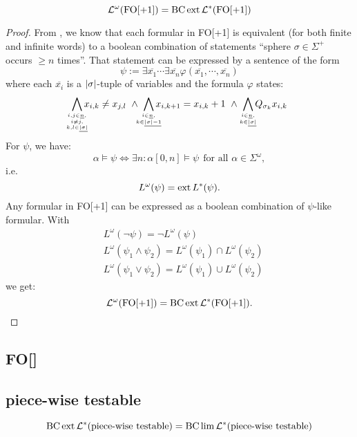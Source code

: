 \begin{thm}
\[ \mathcal{L}^\omega (\mathrm{FO[+1]}) = \operatorname{BC} \operatorname{ext} \mathcal{L}^*(\mathrm{FO[+1]}) \]
\end{thm}

\begin{proof}
From \cite[Theorem 4.8]{LangAutLogic}, we know that each formular in FO[+1] is equivalent (for both finite and infinite words) to a boolean combination of statements ``sphere $\sigma \in \Sigma^+$ occurs $\geq n$ times''. That statement can be expressed by a sentence of the form
\[ \psi := \exists \overline{x_1} \dotsb \exists \overline{x_n} \varphi(\overline{x_1}, \dotsb, \overline{x_n}) \]
where each $\overline{x_i}$ is a $\left| \sigma \right|$-tuple of variables and the formula $\varphi$ states:
\[
\bigwedge_{\mathclap{i,j \in \underline{n},\atop { i \neq j,\atop k,l \in \underline{\abs{\sigma}}}}} x_{i,k} \neq x_{j,l}
\ \wedge\ \bigwedge_{\mathclap{i \in \underline{n},\atop k \in \underline{\abs{\sigma}-1}}} x_{i,k+1} = x_{i,k} + 1
\ \wedge\ \bigwedge_{\mathclap{i \in \underline{n},\atop k \in \underline{\abs{\sigma}}}} Q_{\sigma_k} x_{i,k}
\]
For $\psi$, we have:
\[ \alpha \models \psi \Leftrightarrow \exists n \colon \alpha[0,n] \models \psi \ \ \text{for all } \alpha \in \Sigma^\omega , \]
i.e.
\[ L^\omega(\psi) = \operatorname{ext} L^*(\psi) . \]
Any formular in FO[+1] can be expressed as a boolean combination of $\psi$-like formular. With
\begin{align*}
& L^\omega(\neg \psi) = \neg L^\omega(\psi) \\
& L^\omega(\psi_1 \wedge \psi_2) = L^\omega(\psi_1) \cap L^\omega(\psi_2) \\
& L^\omega(\psi_1 \vee \psi_2) = L^\omega(\psi_1) \cup L^\omega(\psi_2)
\end{align*}
we get:
\[ \mathcal{L}^\omega(\mathrm{FO[+1]}) = \operatorname{BC} \operatorname{ext} \mathcal{L}^*(\mathrm{FO[+1]}). \]

\end{proof}

\subsection{FO[]}
\subsection{piece-wise testable}

\label{thm.PT}
\begin{thm}
\[ \operatorname{BC} \operatorname{ext} \mathcal{L}^* (\textup{\textrm{piece-wise testable}}) = \operatorname{BC} \lim \mathcal{L}^* (\textup{\textrm{piece-wise testable}}) \]
\end{thm}

